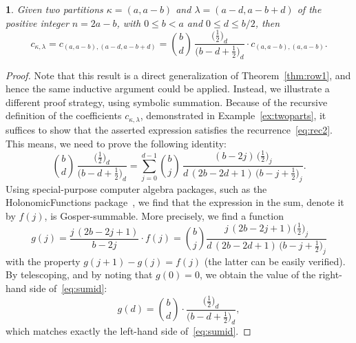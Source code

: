 \documentclass[10pt,oneside,american]{amsart}
\numberwithin{equation}{section}
\numberwithin{figure}{section}
\theoremstyle{plain}
\theoremstyle{definition}
\theoremstyle{remark}
\theoremstyle{plain}
\newtheorem{prop}[thm]{\protect\propositionname}
\theoremstyle{definition}
\theoremstyle{plain}
\theoremstyle{plain}
\providecommand{\propositionname}{Proposition}
\begin{document}
\begin{prop}\label{prop:p2row}
  Given two partitions $\kappa=(a,a-b)$ and $\lambda=(a-d,a-b+d)$ of the positive integer $n=2a-b$,
  with $0\leq b<a$ and $0\leq d\leq b/2$, then
  \begin{equation}\label{eq:2PartRec}
    c_{\kappa,\lambda} = c_{(a,a-b),(a-d,a-b+d)} =
    \binom{b}{d}\,\frac{\bigl(\frac12\bigr)_{\!d}}{\bigl(b-d+\frac12\bigr)_{\!d}} \cdot c_{(a,a-b),(a,a-b)}.
  \end{equation}
\end{prop}
\begin{proof}
  Note that this result is a direct generalization of Theorem~\ref{thm:row1},
  and hence the same inductive argument could be applied. Instead, we
  illustrate a different proof strategy, using symbolic summation. Because of
  the recursive definition of the coefficients $c_{\kappa,\lambda}$,
  demonstrated in Example~\ref{ex:twoparts}, it suffices to show that the
  asserted expression satisfies the recurrence~\eqref{eq:rec2}. This means, we
  need to prove the following identity:
  \begin{equation}\label{eq:sumid}
    \binom{b}{d}\,\frac{\bigl(\frac12\bigr)_{\!d}}{\bigl(b-d+\frac12\bigr)_{\!d}} =
    \sum_{j=0}^{d-1} \binom{b}{j}\,\frac{(b-2j)\,\bigl(\frac12\bigr)_{\!j}}{d\,(2b-2d+1)\,\bigl(b-j+\frac12\bigr)_{\!j}}.
  \end{equation}
  Using special-purpose computer algebra packages, such as the
  HolonomicFunctions package~\cite{HolonomicFunctions}, we find that the
  expression in the sum, denote it by $f(j)$, is Gosper-summable. More
  precisely, we find a function
  \[
    g(j) = \frac{j\,(2b-2j+1)}{b-2j} \cdot f(j) =
    \binom{b}{j}\frac{j\,(2b-2j+1) \bigl(\frac12\bigr)_{\!j}}{d\,(2b-2d+1)\,\bigl(b-j+\frac12\bigr)_{\!j}}
  \]
  with the property $g(j+1)-g(j)=f(j)$ (the latter can be easily
  verified). By telescoping, and by noting that $g(0)=0$, we obtain
  the value of the right-hand side of~\eqref{eq:sumid}:
  \[
    g(d) = \binom{b}{d}\cdot\frac{\bigl(\frac12\bigr)_{\!d}}{\bigl(b-d+\frac12\bigr)_{\!d}},
  \]
  which matches exactly the left-hand side of~\eqref{eq:sumid}.
\end{proof}
\end{document}
